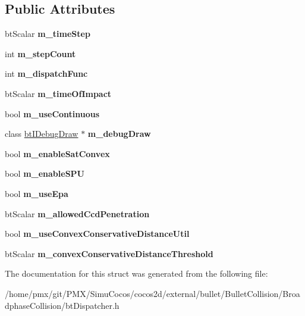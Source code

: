 \subsection*{Public Attributes}
\begin{DoxyCompactItemize}
\item 
\mbox{\label{structbtDispatcherInfo_a1c4cac01cd15ada4cd009407816f80f2}} 
bt\+Scalar {\bfseries m\+\_\+time\+Step}
\item 
\mbox{\label{structbtDispatcherInfo_ab02f0a01c5da00dc5a60be58887439d0}} 
int {\bfseries m\+\_\+step\+Count}
\item 
\mbox{\label{structbtDispatcherInfo_a01a2979ceca5903291152e12cffd73e1}} 
int {\bfseries m\+\_\+dispatch\+Func}
\item 
\mbox{\label{structbtDispatcherInfo_aa4501ea55098cdfd46ed79a59bb5cc0a}} 
bt\+Scalar {\bfseries m\+\_\+time\+Of\+Impact}
\item 
\mbox{\label{structbtDispatcherInfo_ace8ee5a3abf2de5ab913703110190e88}} 
bool {\bfseries m\+\_\+use\+Continuous}
\item 
\mbox{\label{structbtDispatcherInfo_a4c5ed70bc2b29188bd52c071c53a952a}} 
class \hyperlink{classbtIDebugDraw}{bt\+I\+Debug\+Draw} $\ast$ {\bfseries m\+\_\+debug\+Draw}
\item 
\mbox{\label{structbtDispatcherInfo_a8e1f7459054d4ae4aa8930fcb7bc0736}} 
bool {\bfseries m\+\_\+enable\+Sat\+Convex}
\item 
\mbox{\label{structbtDispatcherInfo_af5b2d8b02becb6121fc6e4c9467daa48}} 
bool {\bfseries m\+\_\+enable\+S\+PU}
\item 
\mbox{\label{structbtDispatcherInfo_a84e4b1294ed980dc57db484a5ef8c1d1}} 
bool {\bfseries m\+\_\+use\+Epa}
\item 
\mbox{\label{structbtDispatcherInfo_a4ac54510df1815c7a580c0b84d303048}} 
bt\+Scalar {\bfseries m\+\_\+allowed\+Ccd\+Penetration}
\item 
\mbox{\label{structbtDispatcherInfo_a90032e4af75bd84010f17e495f8cfe45}} 
bool {\bfseries m\+\_\+use\+Convex\+Conservative\+Distance\+Util}
\item 
\mbox{\label{structbtDispatcherInfo_a98a9ecee681b0527e2d9e7a33c5a5fe2}} 
bt\+Scalar {\bfseries m\+\_\+convex\+Conservative\+Distance\+Threshold}
\end{DoxyCompactItemize}


The documentation for this struct was generated from the following file\+:\begin{DoxyCompactItemize}
\item 
/home/pmx/git/\+P\+M\+X/\+Simu\+Cocos/cocos2d/external/bullet/\+Bullet\+Collision/\+Broadphase\+Collision/bt\+Dispatcher.\+h\end{DoxyCompactItemize}
